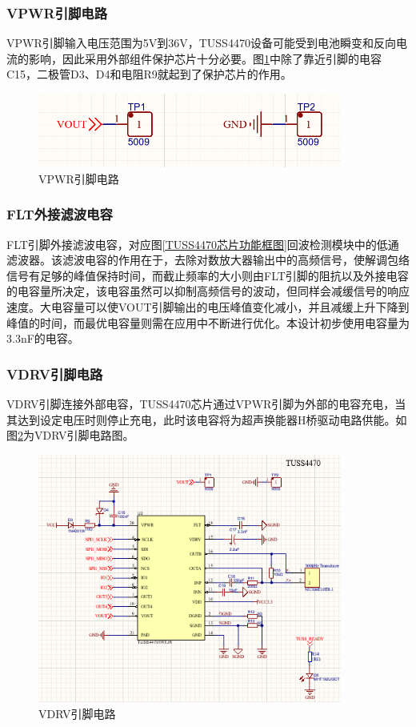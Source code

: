     \subsubsection{VPWR引脚电路}
    VPWR引脚输入电压范围为5V到36V，TUSS4470设备可能受到电池瞬变和反向电流的影响，因此采用外部组件保护芯片十分必要。图\ref{VPWR引脚}中除了靠近引脚的电容C15，二极管D3、D4和电阻R9就起到了保护芯片的作用。
     \begin{figure}[ht]
    	\centering
    	\includegraphics[width=10cm]{figure/vout pin.png}
    	\caption{VPWR引脚电路}
    	\label{VPWR引脚}
    \end{figure}
    
    \subsubsection{FLT外接滤波电容}
    FLT引脚外接滤波电容，对应图\ref{TUSS4470芯片功能框图}回波检测模块中的低通滤波器。该滤波电容的作用在于，去除对数放大器输出中的高频信号，使解调包络信号有足够的峰值保持时间，而截止频率的大小则由FLT引脚的阻抗以及外接电容的电容量所决定，该电容虽然可以抑制高频信号的波动，但同样会减缓信号的响应速度。大电容量可以使VOUT引脚输出的电压峰值变化减小，并且减缓上升下降到峰值的时间，而最优电容量则需在应用中不断进行优化。本设计初步使用电容量为3.3nF的电容。
    \subsubsection{VDRV引脚电路}
    VDRV引脚连接外部电容，TUSS4470芯片通过VPWR引脚为外部的电容充电，当其达到设定电压时则停止充电，此时该电容将为超声换能器H桥驱动电路供能。如图\ref{VDRV引脚电路}为VDRV引脚电路图。
        \begin{figure}[ht]
    	\centering
    	\includegraphics[width=10cm]{figure/TUSS4470 peripheral circuit.png}
    	\caption{VDRV引脚电路}
    	\label{VDRV引脚电路}
    \end{figure}
